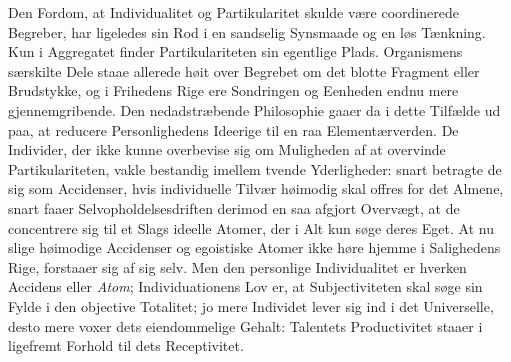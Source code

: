 \documentclass[12pt]{book}
\newcommand{\opage}[1]{\marginnote{\footnotesize\textit{[#1]}}}
\begin{document}
Den Fordom, at Individualitet og Partikularitet skulde være coordinerede Begreber,
har ligeledes sin Rod i en sandselig Synsmaade og en løs Tænkning. Kun i Aggregatet
finder Partikulariteten sin egentlige Plads. Organismens særskilte Dele staae
allerede høit over Begrebet om det blotte
\opage{275} Fragment eller Brudstykke, og i Frihedens Rige ere Sondringen og Eenheden endnu mere
gjennemgribende. Den nedadstræbende Philosophie gaaer da i dette Tilfælde ud paa, at
reducere Personlighedens Ideerige til en raa Elementærverden. De Individer, der ikke
kunne overbevise sig om Muligheden af at overvinde Partikulariteten, vakle bestandig
imellem tvende Yderligheder: snart betragte de sig som Accidenser, hvis individuelle
Tilvær høimodig skal offres for det Almene, snart faaer Selvopholdelsesdriften
derimod en saa afgjort Overvægt, at de concentrere sig til et Slags ideelle Atomer,
der i Alt kun søge deres Eget. At nu slige høimodige Accidenser og egoistiske Atomer
ikke høre hjemme i Salighedens Rige, forstaaer sig af sig selv. Men den personlige
Individualitet er hverken Accidens eller \emph{Atom}; Individuationens Lov er, at
Subjectiviteten skal søge sin Fylde i den objective Totalitet; jo mere Individet
lever sig ind i det Universelle, desto mere voxer dets eiendommelige Gehalt:
Talentets Productivitet staaer i ligefremt Forhold til dets Receptivitet.
\end{document}
